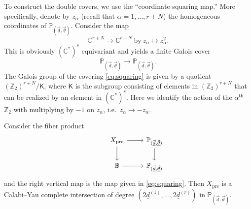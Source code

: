 \documentclass[12pt,a4paper,oneside]{amsart}
\numberwithin{equation}{section}
\theoremstyle{definition}
\theoremstyle{remark}
\newcommand{\Xpre}{X_{\mathrm{pre}}}
\begin{document}
To construct the double covers, we use the ``coordinate squaring map.''
More specifically, denote by \(z_{\alpha}\) (recall
that \(\alpha=1,\ldots,r+N\)) the homogeneous coordinates
of \(\mathbb{P}_{(\vec{\underline{d}}, \vec{\underline{\theta}})}\).
Consider the map
\begin{equation*}
    \mathbb{C}^{r+N}\to \mathbb{C}^{r+N}~\mbox{by}~z_{\alpha}\mapsto z_{\alpha}^{2}.
\end{equation*}
This is obviously \((\mathbb{C}^{\ast})^{s}\) equivariant and yields a finite Galois cover
\begin{equation}
\label{eq:squaring}
    \mathbb{P}_{(\vec{\underline{d}}, \vec{\underline{\theta}})}
    \to \mathbb{P}_{(\vec{\underline{d}}, \vec{\underline{\theta}})}.
\end{equation}
The Galois group of the covering
\eqref{eq:squaring} is given by a quotient 
\((\mathbb{Z}_{2})^{r+N}\slash \mathsf{K}\), where \(\mathsf{K}\) is the subgroup
consisting of elements in \((\mathbb{Z}_{2})^{r+N}\)
that can be realized by an element in \((\mathbb{C}^{\ast})^{s}\).
Here we identify the action of the $\alpha^{\text{th}}$ $\mathbb{Z}_{2}$ 
with multiplying by \(-1\) on \(z_{\alpha}\), i.e.~\(z_{\alpha}\mapsto -z_{\alpha}\).

Consider the fiber product
\begin{equation*}
    \begin{tikzcd}
        &\Xpre\ar[r]\ar[d] &\mathbb{P}_{(\vec{\underline{d}}, \vec{\underline{\theta}})}\ar[d]\\
        &\mathbb{B}\ar[r]&\mathbb{P}_{(\vec{\underline{d}}, \vec{\underline{\theta}})}
    \end{tikzcd}
\end{equation*}
and the right vertical map is the map given in \eqref{eq:squaring}.
Then \(\Xpre\) is a Calabi--Yau complete intersection
of degree \((2\underline{d}^{(1)}, \dots, 2\underline{d}^{(r)})\) in 
\(\mathbb{P}_{(\vec{\underline{d}}, \vec{\underline{\theta}})}\).
\end{document}
